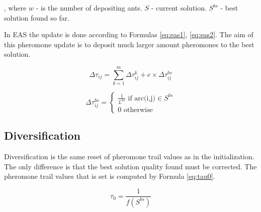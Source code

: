 \documentclass[12pt]{article}
\begin{document}
, where $w$ - is the number of depositing ants.
$S$ - current solution.
$S^{bs}$ - best solution found so far.

In EAS the update is done according to Formulas \ref{eq:eas1}, \ref{eq:eas2}. The aim of this pheromone update is to deposit much larger amount pheromones to the best solution.

\begin{equation}
\Delta\tau_{ij} = \sum_{k=1}^{m} \Delta \tau_{ij}^k + e \times \Delta\tau_{ij}^{bs}
\label{eq:eas1}
\end{equation}

\begin{equation}
\Delta\tau_{ij}^{bs} = \begin{cases}
    \frac{1}{L^{bs}} \text{ if arc(i,j)} \in S^{bs}\\
    0 \text{ otherwise}
  \end{cases}
\label{eq:eas2}
\end{equation}

\subsection{Diversification}

Diversification is the same reset of pheromone trail values as in the initialization. The only difference is that the best solution quality found must be corrected. The pheromone trail values that is set is computed by Formula \ref{eq:tau0}.

\begin{equation}
\tau_0=\frac{1}{f(S^{bs})}
\label{eq:tau0}
\end{equation}



\end{document}
